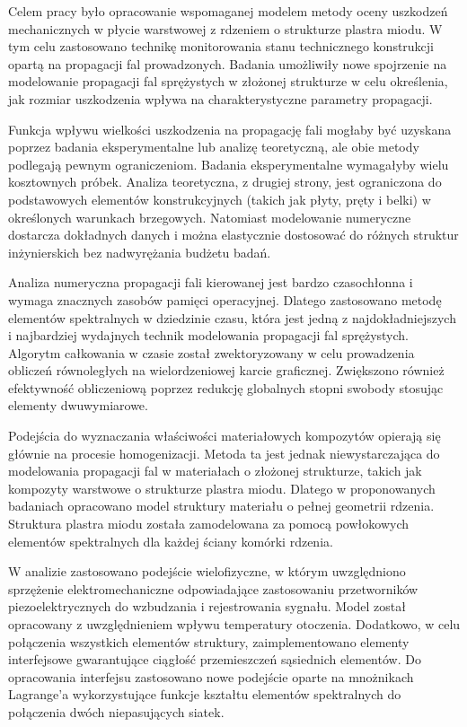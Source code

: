 \documentclass[11pt,a4paper,final]{report}
\theoremstyle{plain}
\begin{document}
{
Celem pracy było opracowanie wspomaganej modelem metody oceny uszkodzeń mechanicznych w płycie warstwowej z rdzeniem o strukturze plastra miodu. W tym celu zastosowano technikę monitorowania stanu technicznego konstrukcji opartą na propagacji fal prowadzonych. Badania umożliwiły nowe spojrzenie na modelowanie propagacji fal sprężystych w złożonej strukturze w celu określenia, jak rozmiar uszkodzenia wpływa na charakterystyczne parametry propagacji.

Funkcja wpływu wielkości uszkodzenia na propagację fali mogłaby być uzyskana poprzez badania eksperymentalne lub analizę teoretyczną, ale obie metody podlegają pewnym ograniczeniom. Badania eksperymentalne wymagałyby wielu kosztownych próbek. Analiza teoretyczna, z drugiej strony, jest ograniczona do podstawowych elementów konstrukcyjnych (takich jak płyty, pręty i belki) w określonych warunkach brzegowych. Natomiast modelowanie numeryczne dostarcza dokładnych danych i można elastycznie dostosować do różnych struktur inżynierskich bez nadwyrężania budżetu badań.

Analiza numeryczna propagacji fali kierowanej jest bardzo czasochłonna i wymaga znacznych zasobów pamięci operacyjnej. Dlatego zastosowano metodę elementów spektralnych w dziedzinie czasu, która jest jedną z najdokładniejszych i najbardziej wydajnych technik modelowania propagacji fal sprężystych. Algorytm całkowania w czasie został zwektoryzowany w celu prowadzenia obliczeń równoległych na wielordzeniowej karcie graficznej. Zwiększono również efektywność obliczeniową poprzez redukcję globalnych stopni swobody stosując elementy dwuwymiarowe.

Podejścia do wyznaczania właściwości materiałowych kompozytów opierają się głównie na procesie homogenizacji. Metoda ta jest jednak niewystarczająca do modelowania propagacji fal w materiałach o złożonej strukturze, takich jak kompozyty warstwowe o strukturze plastra miodu. Dlatego w proponowanych badaniach opracowano model struktury materiału o pełnej geometrii rdzenia. Struktura plastra miodu została zamodelowana za pomocą powłokowych elementów spektralnych dla każdej ściany komórki rdzenia.

W analizie zastosowano podejście wielofizyczne, w którym uwzględniono sprzężenie elektromechaniczne odpowiadające zastosowaniu przetworników piezoelektrycznych do wzbudzania i rejestrowania sygnału. Model został opracowany z uwzględnieniem wpływu temperatury otoczenia. Dodatkowo, w celu połączenia wszystkich elementów struktury, zaimplementowano elementy interfejsowe gwarantujące ciągłość przemieszczeń sąsiednich elementów. Do opracowania interfejsu zastosowano nowe podejście oparte na mnożnikach Lagrange'a wykorzystujące funkcje kształtu elementów spektralnych do połączenia dwóch niepasujących siatek.

}
\end{document}
